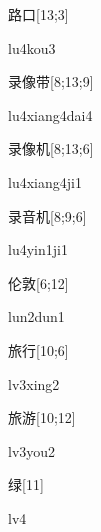 \begin{verbete}[lu4kou3]{路口}[13;3]
\begin{pronuncia}{lu4kou3}
\end{pronuncia}
\end{verbete}

\begin{verbete}{录像带}[8;13;9]
\begin{pronuncia}{lu4xiang4dai4}
\end{pronuncia}
\end{verbete}

\begin{verbete}[lu4xiang4ji1]{录像机}[8;13;6]
\begin{pronuncia}{lu4xiang4ji1}
\end{pronuncia}
\end{verbete}

\begin{verbete}[lu4yin1ji1]{录音机}[8;9;6]
\begin{pronuncia}{lu4yin1ji1}
\end{pronuncia}
\end{verbete}

\begin{verbete}{伦敦}[6;12]
\begin{pronuncia}{lun2dun1}
\end{pronuncia}
\end{verbete}

\begin{verbete}[lv3xing2]{旅行}[10;6]
\begin{pronuncia}{lv3xing2}
\end{pronuncia}
\end{verbete}

\begin{verbete}[lv3you2]{旅游}[10;12]
\begin{pronuncia}{lv3you2}
\end{pronuncia}
\end{verbete}

\begin{verbete}[lv4]{绿}[11]
\begin{pronuncia}{lv4}
\end{pronuncia}
\end{verbete}


